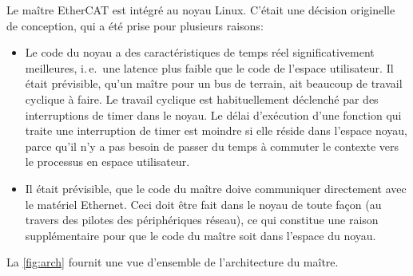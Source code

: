 \documentclass[a4paper,12pt,BCOR=6mm,bibtotoc,idxtotoc]{scrbook}
\begin{document}
Le ma\^itre EtherCAT est int\'egr\'e au noyau Linux. C'\'etait une
d\'ecision originelle de conception, qui a \'et\'e prise pour
plusieurs raisons:

\begin{itemize}

\item Le code du noyau a des caract\'eristiques de temps r\'eel
  significativement meilleures, i.\,e.\ une latence plus faible que le
  code de l'espace utilisateur. Il \'etait pr\'evisible, qu'un
  ma\^itre pour un bus de terrain, ait beaucoup de travail cyclique
  \`a faire.  Le travail cyclique est habituellement d\'eclench\'e par
  des interruptions de timer dans le noyau.  Le d\'elai d'ex\'ecution
  d'une fonction qui traite une interruption de timer est moindre si
  elle r\'eside dans l'espace noyau, parce qu'il n'y a pas besoin de
  passer du temps \`a commuter le contexte vers le processus en espace
  utilisateur.

\item Il \'etait pr\'evisible, que le code du ma\^itre doive
  communiquer directement avec le mat\'eriel Ethernet.  Ceci doit
  \^etre fait dans le noyau de toute fa\c{c}on (au travers des pilotes
  des p\'eriph\'eriques r\'eseau), ce qui constitue une raison
  suppl\'ementaire pour que le code du ma\^itre soit dans l'espace du
  noyau.

\end{itemize}

La \autoref{fig:arch} fournit une vue d'ensemble de l'architecture du
ma\^itre.
\end{document}
